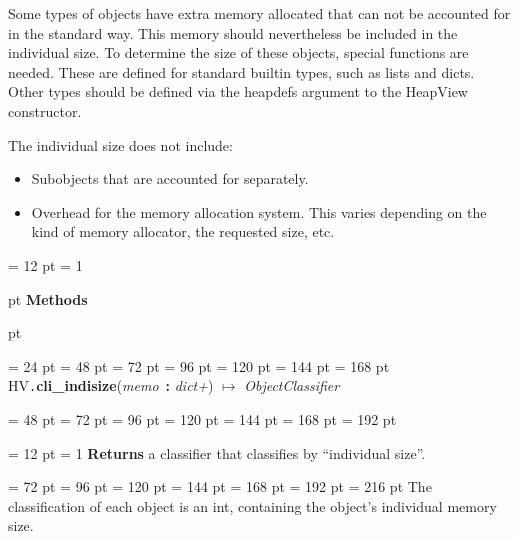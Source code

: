 {{{Some types of objects have extra memory allocated that can not be
accounted for in the standard way. This memory should nevertheless be
included in the individual size. To determine the size of these
objects, special functions are needed. These are defined for standard
builtin types, such as lists and dicts. Other types should be defined
via the heapdefs argument to the HeapView constructor.
 \par}
{\par 
 The individual size does not include: \par}
\begin{itemize}
\item  Subobjects that are accounted for separately.\item  Overhead for the memory allocation system. This varies depending
  on the kind of memory allocator, the requested size, etc.
\end{itemize}
\par}
{\par \pagebreak[3.300000] \noindent \hangindent = 12 pt \hangafter = 1 
{\par \pagebreak[3]  pt \noindent
{\Large {\bf Methods\/}}\par {} pt
} \noindent
\par}
{\par \noindent  \leftskip = 24 pt  \leftmargini = 48 pt  \leftmarginii = 72 pt  \leftmarginiii = 96 pt  \leftmarginiv = 120 pt  \leftmarginv = 144 pt  \leftmarginvi = 168 pt HV{\tt .\/}{\bf {\large {\bf cli{\_}indisize\/}}\/}({\em memo\/}~{\bf :}  {\em dict+\/}) \(\mapsto \)  {\em ObjectClassifier\/}{\par \noindent
{\par \noindent  \leftskip = 48 pt  \leftmargini = 72 pt  \leftmarginii = 96 pt  \leftmarginiii = 120 pt  \leftmarginiv = 144 pt  \leftmarginv = 168 pt  \leftmarginvi = 192 pt {\par \noindent
{\par \pagebreak[3.100000] \noindent \hangindent = 12 pt \hangafter = 1 
{\bf Returns \/} a classifier that classifies by ``individual size''.\par}
{\par \noindent  \leftskip = 72 pt  \leftmargini = 96 pt  \leftmarginii = 120 pt  \leftmarginiii = 144 pt  \leftmarginiv = 168 pt  \leftmarginv = 192 pt  \leftmarginvi = 216 pt  The classification of each object is an int, containing the
object's individual memory size.\par}
\par}
}}}}

